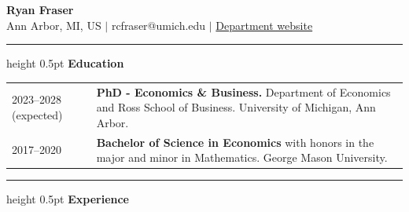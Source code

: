 \documentclass[a4paper,11pt]{article}
\newcommand{\CVSection}[1]{%
  \vspace{1.5em}
  \hrule height 0.5pt
  \vspace{0.8em}
  \noindent\textbf{#1}
  \vspace{0.5em}\par
}
\newcommand{\CVSectionNoTitle}{%
    \vspace{2em}
    \hrule
    \vspace{0.8em}
}
\begin{document}
\noindent
\begin{center} \textbf{Ryan Fraser} \\ Ann Arbor, MI, US $\mid$ rcfraser@umich.edu $\mid$ \href{https://lsa.umich.edu/econ/people/phd-students/rcfraser.html}{Department website}  \end{center} 



\vspace{-3mm}



\CVSection{Education}

\begin{tabularx}{\linewidth}{@{}lX@{}}
 2023--2028 (expected)    & \textbf{PhD - Economics \& Business.} Department of Economics and Ross School of Business. University of Michigan, Ann Arbor. \\
 2017--2020    & \textbf{Bachelor of Science in Economics} with honors in the major and minor in Mathematics. George Mason University.
\end{tabularx}



\CVSection{Experience}
\end{document}
